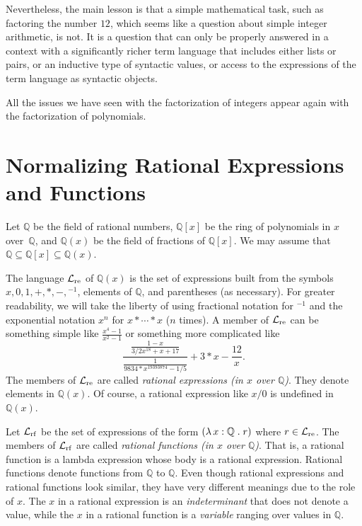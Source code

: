 \documentclass[fleqn]{llncs}
\newcommand{\QQ}{\ensuremath{\mathbb{Q}}}
\newcommand{\funQ}[1]{\ensuremath{\LambdaApp x : \QQ \mdot #1}}
\newcommand{\Langre}{\ensuremath{\mathcal{L}}_{\rm re}}
\newcommand{\Langrf}{\ensuremath{\mathcal{L}}_{\rm rf}}
\begin{document}
Nevertheless, the main lesson is that a simple mathematical task, such
as factoring the number $12$, which seems like a question about simple
integer arithmetic, is not.  It is a question that can only be
properly answered in a context with a significantly richer term
language that includes either lists or pairs, or an inductive type of
syntactic values, or access to the expressions of the term language as
syntactic objects.

All the issues we have seen with the factorization of integers appear
again with the factorization of polynomials.

\section{Normalizing Rational Expressions and Functions}\label{sec:rational}

Let $\QQ$ be the field of rational numbers, $\QQ[x]$ be the ring of
polynomials in $x$ over~$\QQ$, and $\QQ(x)$ be the field of fractions
of $\QQ[x]$.  We may assume that $\QQ \subseteq \QQ[x] \subseteq
\QQ(x)$.  

The language $\Langre$ of $\QQ(x)$ is the set of expressions built from
the symbols $x, 0, 1, +, *, -, \phantom{}^{-1}$, elements of $\QQ$,
and parentheses (as necessary).  For greater readability, we will take
the liberty of using fractional notation for $\phantom{}^{-1}$ and the
exponential notation $x^n$ for $x * \cdots * x$ ($n$ times).  A member
of $\Langre$ can be something simple like $\frac{x^4-1}{x^2-1}$ or
something more complicated like
\begin{equation*}
\frac{\frac{1-x}{3/2 x^{18} + x + 17}}
     {\frac{1}{9834*x^{19393874}-1/5}}+3*x -\frac{12}{x}.
\end{equation*}
The members of $\Langre$ are called \emph{rational expressions (in $x$
  over $\QQ$)}.  They denote elements in $\QQ(x)$.  Of course, a
rational expression like $x/0$ is undefined in $\QQ(x)$.

Let $\Langrf$ be the set of expressions of the form $(\funQ{r})$ where
$r \in \Langre$.  The members of $\Langrf$ are called \emph{rational
  functions (in $x$ over $\QQ$)}.  That is, a rational function is a
lambda expression whose body is a rational expression.  Rational
functions denote functions from $\QQ$ to $\QQ$.  Even though rational
expressions and rational functions look similar, they have very
different meanings due to the role of $x$.  The $x$ in a rational
expression is an \emph{indeterminant} that does not denote a value,
while the $x$ in a rational function is a \emph{variable} ranging over
values in $\QQ$.
\end{document}
